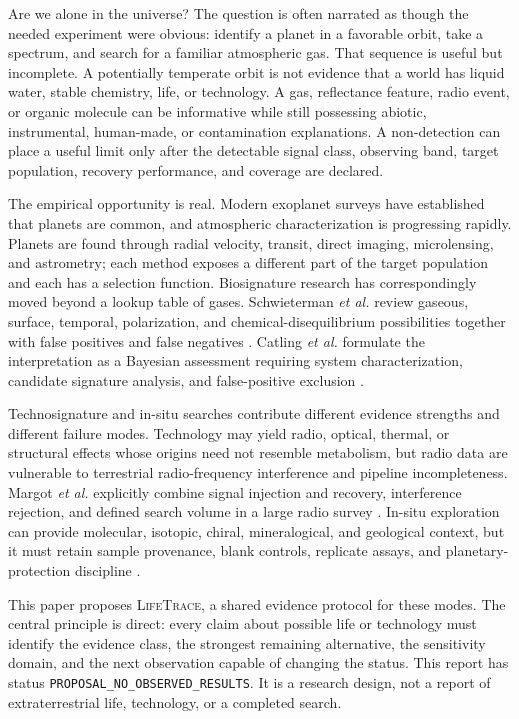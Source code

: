 \documentclass[conference]{IEEEtran}
\newcommand{\lifetrace}{\textsc{LifeTrace}}
\begin{document}
Are we alone in the universe? The question is often narrated as though the needed experiment were obvious: identify a planet in a favorable orbit, take a spectrum, and search for a familiar atmospheric gas. That sequence is useful but incomplete. A potentially temperate orbit is not evidence that a world has liquid water, stable chemistry, life, or technology. A gas, reflectance feature, radio event, or organic molecule can be informative while still possessing abiotic, instrumental, human-made, or contamination explanations. A non-detection can place a useful limit only after the detectable signal class, observing band, target population, recovery performance, and coverage are declared.

The empirical opportunity is real. Modern exoplanet surveys have established that planets are common, and atmospheric characterization is progressing rapidly. Planets are found through radial velocity, transit, direct imaging, microlensing, and astrometry; each method exposes a different part of the target population and each has a selection function. Biosignature research has correspondingly moved beyond a lookup table of gases. Schwieterman \emph{et al.} review gaseous, surface, temporal, polarization, and chemical-disequilibrium possibilities together with false positives and false negatives \cite{schwieterman2018}. Catling \emph{et al.} formulate the interpretation as a Bayesian assessment requiring system characterization, candidate signature analysis, and false-positive exclusion \cite{catling2018}.

Technosignature and in-situ searches contribute different evidence strengths and different failure modes. Technology may yield radio, optical, thermal, or structural effects whose origins need not resemble metabolism, but radio data are vulnerable to terrestrial radio-frequency interference and pipeline incompleteness. Margot \emph{et al.} explicitly combine signal injection and recovery, interference rejection, and defined search volume in a large radio survey \cite{margot2023}. In-situ exploration can provide molecular, isotopic, chiral, mineralogical, and geological context, but it must retain sample provenance, blank controls, replicate assays, and planetary-protection discipline \cite{neveu2018,neveu2020}.

This paper proposes \lifetrace{}, a shared evidence protocol for these modes. The central principle is direct: every claim about possible life or technology must identify the evidence class, the strongest remaining alternative, the sensitivity domain, and the next observation capable of changing the status. This report has status \texttt{PROPOSAL\_NO\_OBSERVED\_RESULTS}. It is a research design, not a report of extraterrestrial life, technology, or a completed search.
\end{document}

